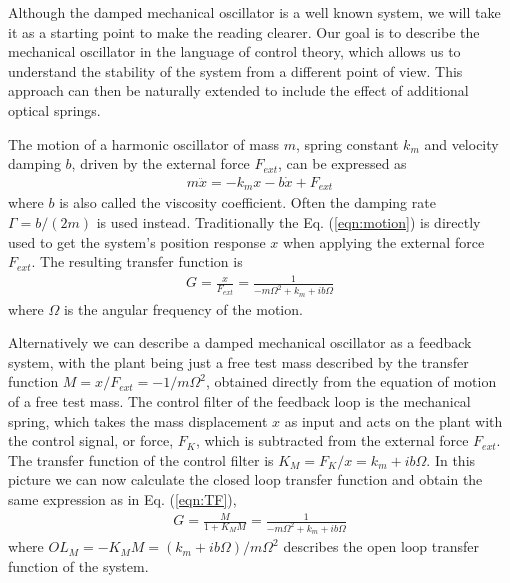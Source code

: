 Although the damped mechanical oscillator is a well known system, we will take it as a starting point to make the reading clearer. Our goal is to describe the mechanical oscillator in the language of control theory, which allows us to understand the stability of the system from a different point of view. This approach can then be naturally extended to include the effect of additional optical springs. 

The motion of a harmonic oscillator of mass $m$, spring constant $k_m$ and velocity damping $b$, driven by the external force $F_{ext}$, can be expressed as \cite{Saulson90}
\begin{align}
\label{eqn:motion}
m\ddot{x}=-k_m x-b\dot{x}+F_{ext}
\end{align}
where $b$ is also called the viscosity coefficient. Often the damping rate $\Gamma=b/(2 m)$ is used instead.
Traditionally the Eq. (\ref{eqn:motion}) is directly used to get the system's position response $x$ when applying the external force $F_{ext}$. The resulting transfer function is
\begin{align}
\label{eqn:TF}
G=\frac{x}{F_{ext}}=\frac{1}{-m\Omega^2+k_m+ib\Omega}                                                 %
\end{align}
where $\Omega$ is the angular frequency of the motion.

Alternatively we can describe a damped mechanical oscillator as a feedback system,  with the plant being just a free test mass described by the transfer function 
$M=x/F_{ext}=-1/m\Omega^2$,
obtained directly from the equation of motion of a free test mass. 
The control filter of the feedback loop is the mechanical spring, which takes the mass displacement $x$ as input and acts on the plant with the control signal, or force, $F_K$, which is subtracted from the external force $F_{ext}$.
The transfer function of the control filter is $K_M=F_{K}/x=k_m+ib\Omega$. In this picture we can now calculate the closed loop transfer function and obtain the same expression as in Eq. (\ref{eqn:TF}),
\begin{align}
\label{eqn:TF_fm}
G=\frac{M}{1+K_M M}=
\frac{1}{-m\Omega^2+k_m+ib\Omega}
\end{align}
where $OL_M=-K_M  M = (k_m+ib\Omega)/m\Omega^2$ describes the open loop transfer function of the system.

